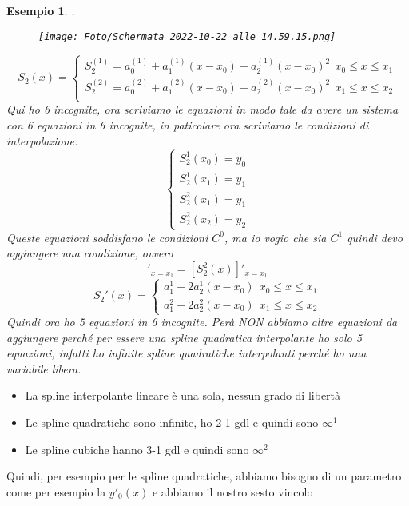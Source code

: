 \documentclass[a4paper, portrait]{book}
\numberwithin{equation}{chapter} %
\newtheorem{example}{Esempio}
\begin{document}
\begin{example}
    .
    \begin{figure}[h!]
        \centering
        \texttt{[image: Foto/Schermata 2022-10-22 alle 14.59.15.png]}
        \caption{}
    \end{figure}
    \begin{equation}
        S_2(x) = \begin{cases}
            S_2^{(1)} = a_0^{(1)} + a_1^{(1)}(x-x_0)+a_2^{(1)}(x-x_0)^2 \ \ x_0 \leq x \leq x_1\\
            S_2^{(2)} = a_0^{(2)} + a_1^{(2)}(x-x_0)+a_2^{(2)}(x-x_0)^2 \ \ x_1 \leq x \leq x_2\\
        \end{cases}
    \end{equation}
    Qui ho 6 incognite, ora scriviamo le equazioni in modo tale da avere un sistema con 6 equazioni in 6 incognite, in paticolare ora scriviamo le condizioni di interpolazione:
    \begin{equation}
        \begin{cases}
            S_2^1(x_0) = y_0\\
            S_2^1(x_1) = y_1\\
            S_2^2(x_1) = y_1\\
            S_2^2(x_2) = y_2
        \end{cases}
    \end{equation}
    Queste equazioni soddisfano le condizioni $C^0$, ma io vogio che sia $C^1$ quindi devo aggiungere una condizione, ovvero
    \begin{equation}
        [S_2^1(x)]'_{x = x_1} = [S_2^2(x)]'_{x = x_1}
    \end{equation}
    \begin{equation}
        S_2'(x) = \begin{cases}
            a_1^1 + 2a_2^1 (x-x_0) \ \ x_0 \leq x \leq x_1\\
            a_1^2 + 2a_2^2 (x-x_0) \ \ x_1 \leq x \leq x_2
        \end{cases}
    \end{equation}
    Quindi ora ho 5 equazioni in 6 incognite. Perà NON abbiamo altre equazioni da aggiungere perché per essere una spline quadratica interpolante ho solo 5 equazioni, infatti ho infinite spline quadratiche interpolanti perché ho una variabile libera.
\end{example}
\begin{itemize}
    \item La spline interpolante lineare è una sola, nessun grado di libertà
    \item Le spline quadratiche sono infinite, ho 2-1 gdl e quindi sono $\infty^1$
    \item Le spline cubiche hanno 3-1 gdl e quindi sono $\infty^2$
\end{itemize}
Quindi, per esempio per le spline quadratiche, abbiamo bisogno di un parametro come per esempio la $y'_0(x)$ e abbiamo il nostro sesto vincolo
\end{document}
